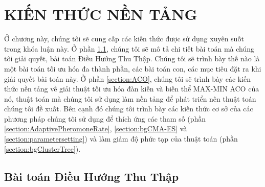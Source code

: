 \chapter{KIẾN THỨC NỀN TẢNG} \label{chapter:BasedKnowledge}
Ở chương này, chúng tôi sẽ cung cấp các kiến thức được sử dụng xuyên suốt trong khóa luận này. Ở phần \ref{section:ProblemDefinition}, chúng tôi sẽ mô tả chi tiết bài toán mà chúng tôi giải quyết, bài toán Điều Hướng Thu Thập. Chúng tôi sẽ trình bày thế nào là một bài toán tối ưu hóa đa thành phần, các bài toán con, các mục tiêu đặt ra khi giải quyết bài toán này. Ở phần \ref{section:ACO}, chúng tôi sẽ trình bày các kiến thức nền tảng về giải thuật tối ưu hóa đàn kiến và biến thể MAX-MIN ACO của nó, thuật toán mà chúng tôi sử dụng làm nền tảng để phát triển nên thuật toán chúng tôi đề xuất. Bên cạnh đó chúng tôi trình bày các kiến thức cơ sở của các phương pháp chúng tôi sử dụng để thích ứng các tham số (phần \ref{section:AdaptivePheromoneRate}, \ref{section:bgCMA-ES} và \ref{section:parametersetting}) và làm giảm độ phức tạp của thuật toán (phần \ref{section:bgClusterTree}).
\section{Bài toán Điều Hướng Thu Thập}\label{section:ProblemDefinition}
